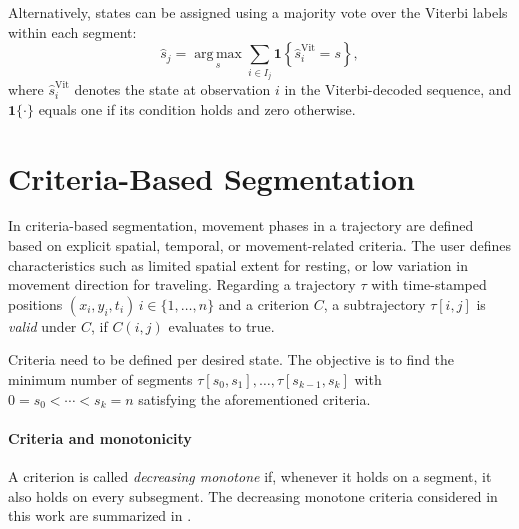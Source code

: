 Alternatively, states can be assigned using a majority vote over the Viterbi labels within each segment:
\[
    \hat s_j
    =
    \operatorname*{arg\,max}_s
    \sum_{i\in I_j}
    \mathbf{1}\!\left\{\hat s_i^{\mathrm{Vit}}=s\right\},
\]
where $\hat s_i^{\mathrm{Vit}}$ denotes the state at
observation $i$ in the Viterbi-decoded sequence, and
$\mathbf{1}\{\cdot\}$ equals one if its condition holds
and zero otherwise.


\section{Criteria-Based Segmentation}
\label{sec:crit-segmentation}
In criteria-based segmentation, movement phases in a trajectory are defined based on explicit spatial, temporal, or movement-related criteria.
The user defines characteristics such as limited spatial extent for resting, or low variation in movement direction for traveling.
Regarding a trajectory $\tau$ with time-stamped positions $(x_i, y_i, t_i)\, i \in \{1,  \ldots, n\}$ and a criterion $C$,
a subtrajectory $\tau[i, j]$ is \emph{valid} under $C$, if $C(i,j)$ evaluates to true.

Criteria need to be defined per desired state.
The objective is to find the minimum number of segments $\tau[s_0, s_1], \ldots, \tau[s_{k-1}, s_k]$ with $0 = s_0 < \cdots < s_k = n$
satisfying the aforementioned criteria.

\paragraph{Criteria and monotonicity}
A criterion is called \emph{decreasing monotone} if, whenever it holds on a segment, it also holds on
every subsegment.
The decreasing monotone criteria considered in this work are summarized in .

